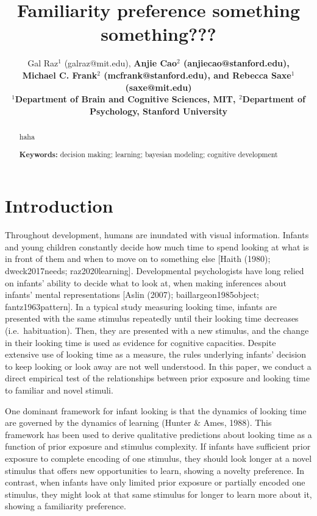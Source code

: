 \documentclass[10pt, letterpaper]{article}
\title{Familiarity preference something something???}
\author{Gal Raz$^1$ (galraz@mit.edu), \bf{Anjie Cao$^2$  (anjiecao@stanford.edu)},\\ \bf{Michael C. Frank$^2$ (mcfrank@stanford.edu)},
 and \bf{Rebecca Saxe$^1$ (saxe@mit.edu)} \\
$^1$Department of Brain and Cognitive Sciences, MIT, $^2$Department of Psychology, Stanford University \\ }
\begin{document}
\maketitle

\begin{abstract}
haha

\textbf{Keywords:}
decision making; learning; bayesian modeling; cognitive development
\end{abstract}

\hypertarget{introduction}{%
\section{Introduction}\label{introduction}}

Throughout development, humans are inundated with visual information.
Infants and young children constantly decide how much time to spend
looking at what is in front of them and when to move on to something
else {[}Haith (1980); dweck2017needs; raz2020learning{]}. Developmental
psychologists have long relied on infants' ability to decide what to
look at, when making inferences about infants' mental representations
{[}Aslin (2007); baillargeon1985object; fantz1963pattern{]}. In a
typical study measuring looking time, infants are presented with the
same stimulus repeatedly until their looking time decreases
(i.e.~habituation). Then, they are presented with a new stimulus, and
the change in their looking time is used as evidence for cognitive
capacities. Despite extensive use of looking time as a measure, the
rules underlying infants' decision to keep looking or look away are not
well understood. In this paper, we conduct a direct empirical test of
the relationships between prior exposure and looking time to familiar
and novel stimuli.

One dominant framework for infant looking is that the dynamics of
looking time are governed by the dynamics of learning (Hunter \& Ames,
1988). This framework has been used to derive qualitative predictions
about looking time as a function of prior exposure and stimulus
complexity. If infants have sufficient prior exposure to complete
encoding of one stimulus, they should look longer at a novel stimulus
that offers new opportunities to learn, showing a novelty preference. In
contrast, when infants have only limited prior exposure or partially
encoded one stimulus, they might look at that same stimulus for longer
to learn more about it, showing a familiarity preference.
\end{document}
